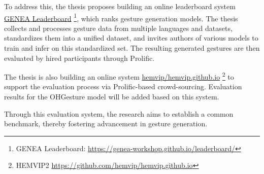 To address this, the thesis proposes building an online leaderboard system \cite{nagy2024towards} \hyperlink{https://genea-workshop.github.io/leaderboard/}{GENEA Leaderboard} \footnote{GENEA Leaderboard: \url{https://genea-workshop.github.io/leaderboard/}}, which ranks gesture generation models. The thesis collects and processes gesture data from multiple languages and datasets, standardizes them into a unified dataset, and invites authors of various models to train and infer on this standardized set. The resulting generated gestures are then evaluated by hired participants through Prolific. 

The thesis is also building an online system \hyperlink{https://github.com/hemvip/hemvip.github.io}{hemvip/hemvip.github.io} \footnote{HEMVIP2 \url{https://github.com/hemvip/hemvip.github.io}} to support the evaluation process via Prolific-based crowd-sourcing. Evaluation results for the OHGesture model will be added based on this system.

Through this evaluation system, the research aims to establish a common benchmark, thereby fostering advancement in gesture generation.











